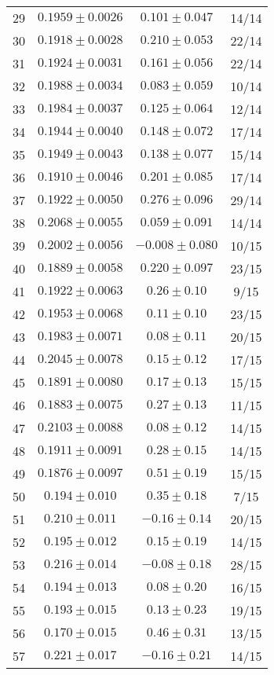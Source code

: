 \begin{tabular}{c|c|c|c}
29 & $0.1959\pm0.0026$ & $0.101\pm0.047$ & 14/14 \\
30 & $0.1918\pm0.0028$ & $0.210\pm0.053$ & 22/14 \\
31 & $0.1924\pm0.0031$ & $0.161\pm0.056$ & 22/14 \\
32 & $0.1988\pm0.0034$ & $0.083\pm0.059$ & 10/14 \\
33 & $0.1984\pm0.0037$ & $0.125\pm0.064$ & 12/14 \\
34 & $0.1944\pm0.0040$ & $0.148\pm0.072$ & 17/14 \\
35 & $0.1949\pm0.0043$ & $0.138\pm0.077$ & 15/14 \\
36 & $0.1910\pm0.0046$ & $0.201\pm0.085$ & 17/14 \\
37 & $0.1922\pm0.0050$ & $0.276\pm0.096$ & 29/14 \\
38 & $0.2068\pm0.0055$ & $0.059\pm0.091$ & 14/14 \\
39 & $0.2002\pm0.0056$ & $-0.008\pm0.080$ & 10/15 \\
40 & $0.1889\pm0.0058$ & $0.220\pm0.097$ & 23/15 \\
41 & $0.1922\pm0.0063$ & $0.26\pm0.10$ & 9/15 \\
42 & $0.1953\pm0.0068$ & $0.11\pm0.10$ & 23/15 \\
43 & $0.1983\pm0.0071$ & $0.08\pm0.11$ & 20/15 \\
44 & $0.2045\pm0.0078$ & $0.15\pm0.12$ & 17/15 \\
45 & $0.1891\pm0.0080$ & $0.17\pm0.13$ & 15/15 \\
46 & $0.1883\pm0.0075$ & $0.27\pm0.13$ & 11/15 \\
47 & $0.2103\pm0.0088$ & $0.08\pm0.12$ & 14/15 \\
48 & $0.1911\pm0.0091$ & $0.28\pm0.15$ & 14/15 \\
49 & $0.1876\pm0.0097$ & $0.51\pm0.19$ & 15/15 \\
50 & $0.194\pm0.010$ & $0.35\pm0.18$ & 7/15 \\
51 & $0.210\pm0.011$ & $-0.16\pm0.14$ & 20/15 \\
52 & $0.195\pm0.012$ & $0.15\pm0.19$ & 14/15 \\
53 & $0.216\pm0.014$ & $-0.08\pm0.18$ & 28/15 \\
54 & $0.194\pm0.013$ & $0.08\pm0.20$ & 16/15 \\
55 & $0.193\pm0.015$ & $0.13\pm0.23$ & 19/15 \\
56 & $0.170\pm0.015$ & $0.46\pm0.31$ & 13/15 \\
57 & $0.221\pm0.017$ & $-0.16\pm0.21$ & 14/15 \\

\end{tabular}
